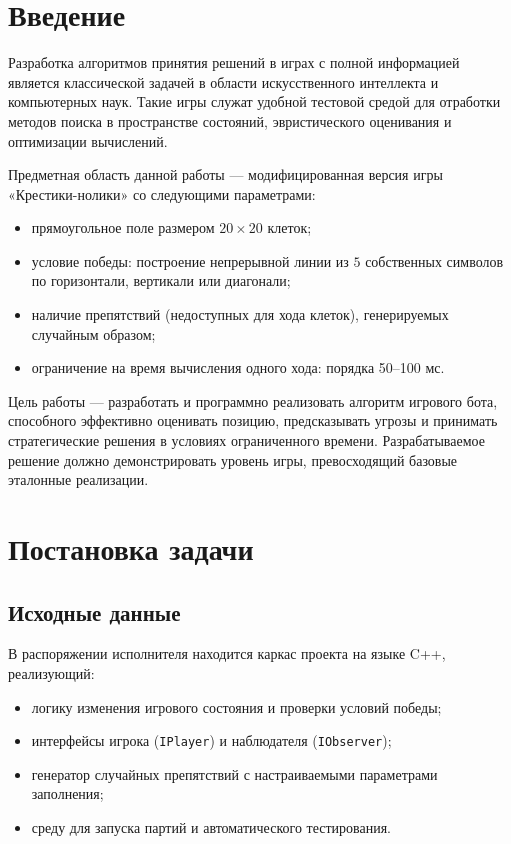 \documentclass[12pt,a4paper]{article}
\begin{document}
\section*{Введение}

Разработка алгоритмов принятия решений в играх с полной информацией является классической задачей в области искусственного интеллекта и компьютерных наук. Такие игры служат удобной тестовой средой для отработки методов поиска в пространстве состояний, эвристического оценивания и оптимизации вычислений.

Предметная область данной работы — модифицированная версия игры «Крестики-нолики» со следующими параметрами:
\begin{itemize}
    \item прямоугольное поле размером $20 \times 20$ клеток;
    \item условие победы: построение непрерывной линии из $5$ собственных символов по горизонтали, вертикали или диагонали;
    \item наличие препятствий (недоступных для хода клеток), генерируемых случайным образом;
    \item ограничение на время вычисления одного хода: порядка 50–100 мс.
\end{itemize}

Цель работы — разработать и программно реализовать алгоритм игрового бота, способного эффективно оценивать позицию, предсказывать угрозы и принимать стратегические решения в условиях ограниченного времени. Разрабатываемое решение должно демонстрировать уровень игры, превосходящий базовые эталонные реализации.

\section{Постановка задачи}

\subsection{Исходные данные}
В распоряжении исполнителя находится каркас проекта на языке C++, реализующий:
\begin{itemize}
    \item логику изменения игрового состояния и проверки условий победы;
    \item интерфейсы игрока (\texttt{IPlayer}) и наблюдателя (\texttt{IObserver});
    \item генератор случайных препятствий с настраиваемыми параметрами заполнения;
    \item среду для запуска партий и автоматического тестирования.
\end{itemize}
\end{document}
